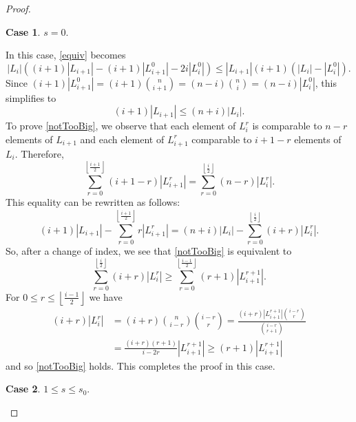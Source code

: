 \documentclass[11 pt]{article}
\theoremstyle{definition}
\theoremstyle{case}
\newtheorem{case2}{Case}
\numberwithin{equation}{section}
\begin{document}
\begin{proof}
\begin{case2}
\label{j=0}
$s=0$.
\end{case2}
In this case, \eqref{equiv} becomes
\[\left|L_i\right|\left((i+1)\left|L_{i+1}\right| - (i+1)\left|L_{i+1}^0\right| - 2i\left|L_i^0\right|\right)\leq \left|L_{i+1}\right|(i+1)\left(\left|L_i\right| - \left|L_i^0\right|\right).\]
Since $(i+1)\left|L_{i+1}^0\right|= (i+1)\binom{n}{i+1} = (n-i)\binom{n}{i}=(n-i)\left|L_i^0\right|$, this simplifies to
\begin{equation}\label{notTooBig}(i+1)\left|L_{i+1}\right|\leq (n+i)\left|L_i\right|.\end{equation}
To prove \eqref{notTooBig}, we observe that each element of $L_i^r$ is comparable to $n-r$ elements of $L_{i+1}$ and each element of $L_{i+1}^r$ comparable to $i+1-r$ elements of $L_i$. Therefore, 
\[\sum_{r=0}^{\left\lfloor\frac{i+1}{2}\right\rfloor}(i+1-r)\left|L_{i+1}^r\right| = \sum_{r=0}^{\left\lfloor\frac{i}{2}\right\rfloor}(n-r)\left|L_{i}^r\right|.\]
This equality can be rewritten as follows:
\[(i+1)\left|L_{i+1}\right| - \sum_{r=0}^{\left\lfloor\frac{i+1}{2}\right\rfloor}r\left|L_{i+1}^r\right| = (n+i)\left|L_i\right| - \sum_{r=0}^{\left\lfloor\frac{i}{2}\right\rfloor}(i+r)\left|L_{i}^r\right|.\]
So, after a change of index, we see that \eqref{notTooBig} is equivalent to
\[\sum_{r=0}^{\left\lfloor\frac{i}{2}\right\rfloor}(i+r)\left|L_i^r\right| \geq \sum_{r=0}^{\left\lfloor\frac{i-1}{2}\right\rfloor}(r+1)\left|L_{i+1}^{r+1}\right|.\]
For $0\leq r\leq \left \lfloor \frac{i-1}{2}\right\rfloor$ we have
\begin{align*}
(i+r)\left|L_i^r\right| &= (i+r)\binom{n}{i-r}\binom{i-r}{r} = \frac{(i+r) \left|L_{i+1}^{r+1}\right|\binom{i-r}{r}}{\binom{i-r}{r+1}}\\
&=\frac{(i+r)(r+1)}{i-2r}\left|L_{i+1}^{r+1}\right|\geq (r+1)\left|L_{i+1}^{r+1}\right|\end{align*}
and so \eqref{notTooBig} holds. This completes the proof in this case.

\begin{case2}
$1\leq s\leq s_0$. 
\end{case2}


\end{proof}
\end{document}

